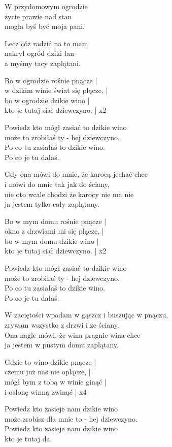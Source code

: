 \begin{text}
    W przydomowym ogrodzie\\
    życie prawie nad stan\\
    mogła byś być moja pani.

    Lecz cóż radzić na to mam\\
    nakrył ogród dziki łan\\
    a myśmy tacy zaplątani.

    \vin Bo w ogrodzie rośnie pnącze |\\
    \vin w dzikim winie świat się plącze, |\\
    \vin bo w ogrodzie dzikie wino |\\
    \vin kto je tutaj siał dziewczyno. | x2

    \vin Powiedz kto mógł zasiać to dzikie wino\\
    \vin może to zrobiłaś ty - hej dziewczyno.\\
    \vin Po co tu zasiałaś to dzikie wino.\\
    \vin Po co je tu dałaś.

    Gdy ona mówi do mnie, że karocą jechać chce\\
    i mówi do mnie tak jak do ściany,\\
    nie oto wcale chodzi że karocy nie ma nie\\
    ja jestem tylko cały zaplątany.

    \vin Bo w mym domu rośnie pnącze |\\
    \vin okno z drzwiami mi się plącze, | \\
    \vin bo w mym domu dzikie wino |\\
    \vin kto je tutaj siał dziewczyno. | x2

    \vin Powiedz kto mógł zasiać to dzikie wino\\
    \vin może to zrobiłaś ty - hej dziewczyno.\\
    \vin Po co tu zasiałaś to dzikie wino.\\
    \vin Po co je tu dałaś.

    W zaciętości wpadam w gąszcz i buszując w pnączu,\\
    zrywam wszystko z drzwi i ze ściany.\\
    Ona nagle mówi, że wina pragnie wina chce\\
    ja jestem w pustym domu zaplątany.

    \vin Gdzie to wino dzikie pnącze |\\
    \vin czemu już nas nie oplącze, |\\
    \vin mógł bym z tobą w winie ginąć |\\
    \vin i osłonę winną zwinąć | x4

    \vin Powiedz kto zasieje nam dzikie wino\\
    \vin może zrobisz dla mnie to - hej dziewczyno.\\
    \vin Powiedz kto zasieje nam dzikie wino\\
    \vin kto je tutaj da.
\end{text}
\begin{chord}

\end{chord}
